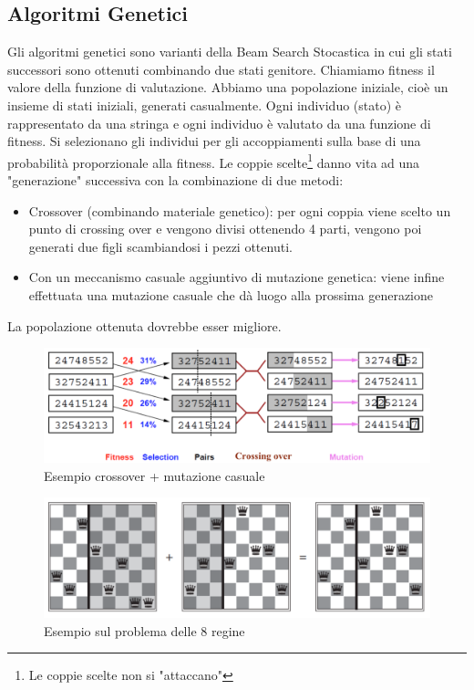 \documentclass{article}
\begin{document}
\subsection{Algoritmi Genetici}
Gli algoritmi genetici sono varianti della Beam Search Stocastica in cui gli stati successori sono ottenuti combinando due stati genitore. Chiamiamo fitness il valore della funzione di valutazione. \newline
Abbiamo una popolazione iniziale, cioè un insieme di stati iniziali, generati casualmente. Ogni individuo (stato) è rappresentato da una stringa e ogni individuo è valutato da una funzione di fitness. Si selezionano gli individui per gli accoppiamenti sulla base di una probabilità proporzionale alla fitness. Le coppie scelte\footnote{Le coppie scelte non si "attaccano"} danno vita ad una "generazione" successiva con la combinazione di due metodi:
\begin{itemize}
    \item Crossover (combinando materiale genetico): per ogni coppia viene scelto un punto di crossing over e vengono divisi ottenendo 4 parti, vengono poi generati due figli scambiandosi i pezzi ottenuti.
    \item Con un meccanismo casuale aggiuntivo di mutazione genetica: viene infine effettuata una mutazione casuale che dà luogo alla prossima generazione
\end{itemize}
La popolazione ottenuta dovrebbe esser migliore.
\begin{figure}[H]
    \centering
    \includegraphics[scale=0.5]{Images/alggeneticicross.png}
    \caption{Esempio crossover + mutazione casuale}
\end{figure}
\begin{figure}[H]
    \centering
    \includegraphics[scale=0.5]{Images/alggenscacchi.png}
    \caption{Esempio sul problema delle 8 regine}
\end{figure}
\end{document}
